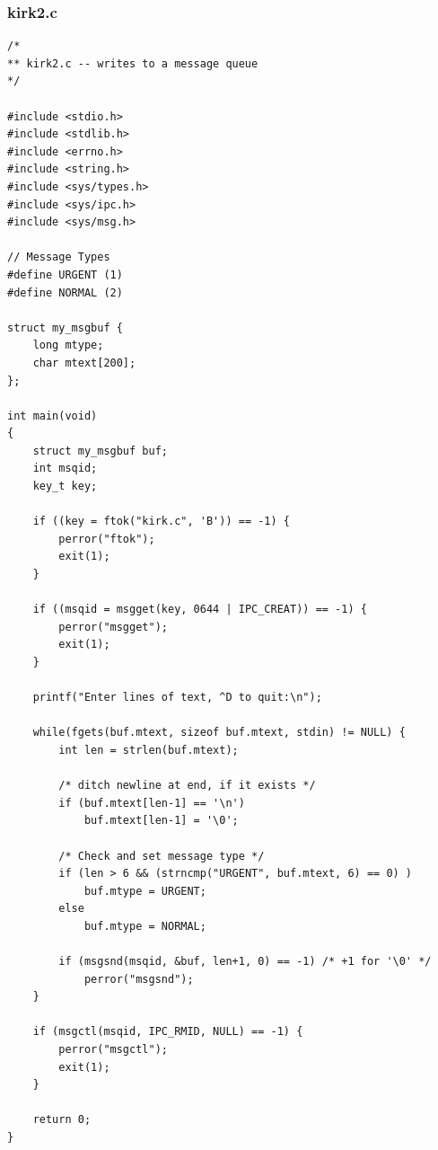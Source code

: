 \documentclass[12pt,a4paper,oneside]{article}
\begin{document}
\subsubsection{kirk2.c}

\begin{lstlisting}[basicstyle=\scriptsize, style=ElliottCListingStyle]
/*
** kirk2.c -- writes to a message queue
*/

#include <stdio.h>
#include <stdlib.h>
#include <errno.h>
#include <string.h>
#include <sys/types.h>
#include <sys/ipc.h>
#include <sys/msg.h>

// Message Types
#define URGENT (1)
#define NORMAL (2)

struct my_msgbuf {
	long mtype;
	char mtext[200];
};

int main(void)
{
	struct my_msgbuf buf;
	int msqid;
	key_t key;

	if ((key = ftok("kirk.c", 'B')) == -1) {
		perror("ftok");
		exit(1);
	}

	if ((msqid = msgget(key, 0644 | IPC_CREAT)) == -1) {
		perror("msgget");
		exit(1);
	}
	
	printf("Enter lines of text, ^D to quit:\n");

	while(fgets(buf.mtext, sizeof buf.mtext, stdin) != NULL) {
		int len = strlen(buf.mtext);

		/* ditch newline at end, if it exists */
		if (buf.mtext[len-1] == '\n')
			buf.mtext[len-1] = '\0';

		/* Check and set message type */
		if (len > 6 && (strncmp("URGENT", buf.mtext, 6) == 0) )
			buf.mtype = URGENT;
		else
			buf.mtype = NORMAL;

		if (msgsnd(msqid, &buf, len+1, 0) == -1) /* +1 for '\0' */
			perror("msgsnd");
	}

	if (msgctl(msqid, IPC_RMID, NULL) == -1) {
		perror("msgctl");
		exit(1);
	}

	return 0;
}
\end{lstlisting}
\newpage
\end{document}
